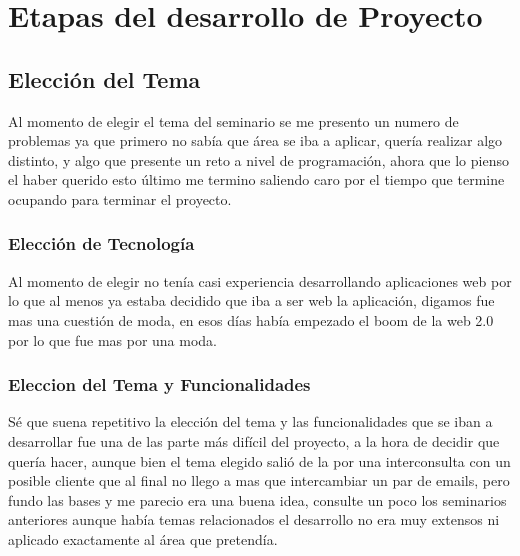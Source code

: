 \chapter{Etapas del desarrollo de Proyecto}

\section{Elección del Tema}

Al momento de elegir el tema del seminario se me presento un numero de problemas ya que primero no sabía que área se iba a aplicar, quería realizar algo distinto, y algo que presente un reto a nivel de programación, ahora que lo pienso el haber querido esto último me termino saliendo caro por el tiempo que termine ocupando para terminar el proyecto. 


\subsection{Elección de Tecnología}

Al momento de elegir no tenía casi experiencia desarrollando aplicaciones web por lo que al menos ya estaba decidido que iba a ser web la aplicación, digamos fue mas una cuestión de moda, en esos días había empezado el boom de la web 2.0 por lo que fue mas por una moda.


\subsection{Eleccion del Tema y Funcionalidades}

Sé que suena repetitivo la elección del tema y las funcionalidades que se iban a desarrollar fue una de las parte más difícil del proyecto, a la hora de decidir que quería hacer, aunque bien el tema elegido salió de la por una interconsulta con un posible cliente que al final no llego a mas que intercambiar un par de emails, pero fundo las bases y me parecio era una buena idea, consulte un poco los seminarios anteriores aunque había temas relacionados el desarrollo no era muy extensos ni aplicado exactamente al área que pretendía.\\[0.1cm]

